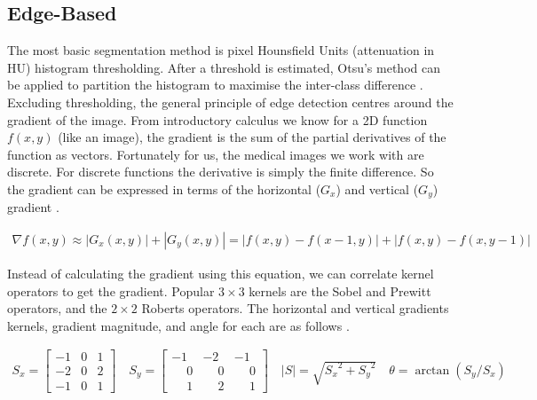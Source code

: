 \documentclass{bmcart}
\begin{document}
\subsection*{Edge-Based}
The most basic segmentation method is pixel Hounsfield Units (attenuation in HU) histogram thresholding. After a threshold is estimated, Otsu's method can be applied to partition the histogram to maximise the inter-class difference \cite{rafati_comparison_2014}. Excluding thresholding, the general principle of edge detection centres around the gradient of the image. From introductory calculus we know for a 2D function $f(x,y)$ (like an image), the gradient is the sum of the partial derivatives of the function as vectors. Fortunately for us, the medical images we work with are discrete. For discrete functions the derivative is simply the finite difference. So the gradient can be expressed in terms of the horizontal ($G_x$) and vertical ($G_y$) gradient \cite{banik_landmarking_2009}.
\begin{ceqn}
\begin{align}
    \nabla f(x,y) \approx |G_x(x,y)|+|G_y(x,y)|=|f(x,y)-f(x-1,y)|+|f(x,y)-f(x,y-1)| 
\end{align}
\end{ceqn}
Instead of calculating the gradient using this equation, we can correlate kernel operators to get the gradient. Popular $3\times3$ kernels are the Sobel and Prewitt operators, and the $2\times2$ Roberts operators. The horizontal and vertical gradients kernels, gradient magnitude, and angle for each are as follows \cite{rafati_comparison_2014}.
\begin{ceqn}
\begin{align}
  S_x = \begin{bmatrix}
        -1 & 0 & 1  \\
        -2 & 0 & 2 \\
        -1 & 0 & 1
      \end{bmatrix}
      \quad
  S_y = \begin{bmatrix}
        -1 & -2 & -1  \\
         \phantom{-}0 &  \phantom{-}0 &  \phantom{-}0 \\
         \phantom{-}1 &  \phantom{-}2 &  \phantom{-}1
      \end{bmatrix}
      \quad
  |S|=\sqrt{{S_x}^2+{S_y}^2}
  \quad
  \theta=\arctan{(S_y/S_x)}
\end{align}
\end{ceqn}
\end{document}
